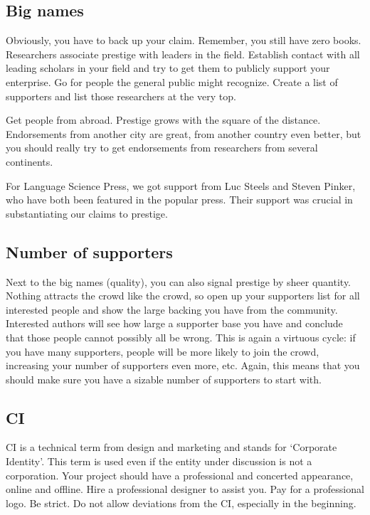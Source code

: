 \documentclass[nonflat,smallfont
]{langsci/langscibook}
\begin{document}
\subsection{Big names}
Obviously, you have to back up your claim. Remember, you still have zero books. Researchers associate prestige with leaders in the field. Establish contact with all leading scholars in your field and try to get them to publicly support your enterprise. Go for people the general public might recognize. Create a list of supporters and list those researchers at the very top.  

Get people from abroad. Prestige grows with the square of the distance. Endorsements from another city are great, from another country even better, but you should really try to get endorsements from researchers from several continents. 

For Language Science Press, we got support from Luc Steels and Steven Pinker, who have both been featured in the popular press. Their support was crucial in substantiating our claims to prestige. 

\subsection{Number of supporters}
Next to the big names (quality), you can also signal prestige by sheer quantity. Nothing attracts the crowd like the crowd, so open up your supporters list for all interested people and show the large backing you have from the community. Interested authors will see how large a supporter base you have and conclude that those people cannot possibly all be wrong. This is again a virtuous cycle: if you have many supporters, people will be more likely to join the crowd, increasing your number of supporters even more, etc. Again, this means that you should make sure you have a sizable number of supporters to start with. 


 
\subsection{CI}\label{sec:CI}
CI is a technical term from design and marketing and stands for `Corporate Identity'. This term is used even if the entity under discussion is not a corporation. Your project should have a professional and concerted appearance, online and offline. Hire a professional designer to assist you. Pay for a professional logo. Be strict. Do not allow deviations from the CI, especially in the beginning.
\end{document}
